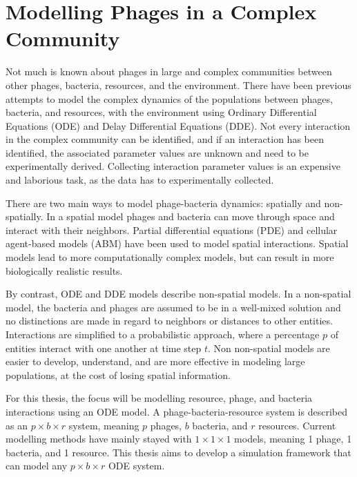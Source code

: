 \section{Modelling Phages in a Complex Community}
Not much is known about phages in large and complex communities between other phages, bacteria, resources, and the environment. 
There have been previous attempts to model the complex dynamics of the populations between phages, bacteria, and resources, with the environment using Ordinary Differential Equations (ODE) and Delay Differential Equations (DDE).
Not every interaction in the complex community can be identified, and if an interaction has been identified, the associated parameter values are unknown and need to be experimentally derived. 
Collecting interaction parameter values is an expensive and laborious task, as the data has to experimentally collected. 

There are two main ways to model phage-bacteria dynamics: spatially and non-spatially.
In a spatial model phages and bacteria can move through space and interact with their neighbors. 
Partial differential equations (PDE) and cellular agent-based models (ABM) have been used to model spatial interactions.
Spatial models lead to more computationally complex models, but can result in more biologically realistic results. 

By contrast, ODE and DDE models describe non-spatial models. 
In a non-spatial model, the bacteria and phages are assumed to be in a well-mixed solution and no distinctions are made in regard to neighbors or distances to other entities. 
Interactions are simplified to a probabilistic approach, where a percentage $p$ of entities interact with one another at time step $t$.
Non non-spatial models are easier to develop, understand, and are more effective in modeling large populations, at the cost of losing spatial information. 

For this thesis, the focus will be modelling resource, phage, and bacteria interactions using an ODE model. 
A phage-bacteria-resource system is described as an $p\times b \times r$ system, meaning $p$ phages, $b$ bacteria, and $r$ resources. 
Current modelling methods have mainly stayed with $1\times 1 \times 1$ models, meaning 1 phage, 1 bacteria, and 1 resource. 
This thesis aims to develop a simulation framework that can model any $p\times b \times r$ ODE system. 
\newline 

